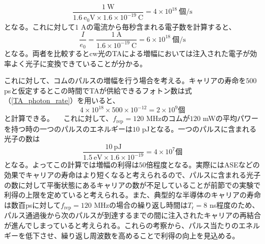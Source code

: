 \documentclass[uplatex, dvipdfmx, a4paper, report, papersize, 11pt]{jsbook}
\begin{document}
\begin{equation}\label{TA_photon_rate}
  \frac{1\ \mathrm{W}}{1.6\ \mathrm{e_0V}\times1.6\times10^{-19}\ \mathrm{C}} = 4\times10^{18}\ 個\mathrm{/s}
\end{equation}
となる。これに対して$1$ Aの電流から毎秒含まれる電子数を計算すると、
\begin{equation}
  \frac{I}{e_0} = \frac{1\ \mathrm{A}}{1.6\times10^{-19}\ \mathrm{C}} = 6\times10^{18}\ 個\mathrm{/s}
\end{equation}
となる。両者を比較するとcw光のTAによる増幅においては注入された電子が効率よく光子に変換できていることが分かる。\par
これに対して、コムのパルスの増幅を行う場合を考える。キャリアの寿命を$500$ psと仮定するとこの時間でTAが供給できるフォトン数は式（\ref{TA_photon_rate}）を用いると、
\begin{equation}
  4\times10^{18}\times500\times10^{-12} = 2\times10^9 個
\end{equation}
と計算できる。
　これに対して、$f_{\mathrm{rep}} = 120$ MHzのコムが$120$ mWの平均パワーを持つ時の一つのパルスのエネルギーは$10$ pJとなる。一つのパルスに含まれる光子の数は
\begin{equation}
  \frac{10\ \mathrm{pJ}}{1.5\ \mathrm{eV}\times1.6\times10^{-19}} = 4\times10^7 個
\end{equation}
となる。よってこの計算では増幅の利得は$50$倍程度となる。実際にはASEなどの効果でキャリアの寿命はより短くなると考えられるので、パルスに含まれる光子の数に対して平衡状態にあるキャリアの数が不足していることが前節での実験で利得の上限を定めていると考えられる。また、典型的な半導体のキャリアの寿命は数百psに対して$f_{\mathrm{rep}} = 120$ MHzの場合の繰り返し時間は$T_\mathrm{r} = 8$ ns程度のため、パルス通過後から次のパルスが到達するまでの間に注入されたキャリアの再結合が進んでしまっていると考えられる。これらの考察から、パルス当たりのエネルギーを低下させ、繰り返し周波数を高めることで利得の向上を見込める。
\end{document}
